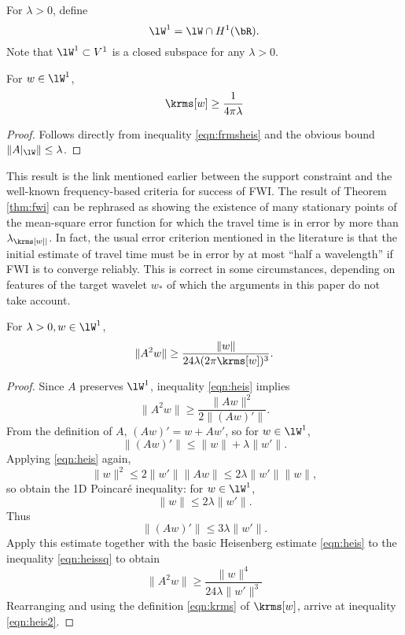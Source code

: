 For $\lambda >0$, define
\begin{equation}
  \label{eqn:wlam1}
  \lW^1 = \lW \cap H^1(\bR).
\end{equation}
Note that $\lW^1 \subset V^1$ is a closed subspace for any
$\lambda>0$.

\begin{proposition}
  \label{thm:klam}
  For $w \in \lW^1$,
  \[
    \krms[w] \ge \frac{1}{4 \pi \lambda}
  \]
\end{proposition}

\begin{proof}
  Follows directly from inequality \ref{eqn:frmsheis} and the obvious bound
  $\|A|_{\lW}\|\le \lambda$.
\end{proof}

 This result is the link mentioned earlier between the support
constraint and the well-known frequency-based criteria for success of
FWI. The result of Theorem \ref{thm:fwi} can be rephrased as showing the
existence of many stationary points of the mean-square error function
for which the travel time is in error by more than
$\lambda_{\krms[w]|}$. In fact, the usual error criterion mentioned in the
literature is that the initial estimate of travel time must be in error by at most ``half a
wavelength'' if FWI is to converge reliably. This is correct in some
circumstances, depending on features of the target wavelet $w_*$ of
which the arguments in this paper do not take account.

\begin{proposition}
  \label{thm:heis2}
  For $\lambda>0, w \in \lW^1$,
  \begin{equation}
    \label{eqn:heis2}
    \|A^2w\| \ge \frac{\|w\|}{24 \lambda (2\pi\krms[w])^3}.
  \end{equation}
\end{proposition}

\begin{proof}
  Since $A$  preserves $\lW^1$, inequality \ref{eqn:heis} implies
  \begin{equation}
    \label{eqn:heissq}
    \|A^2w\| \ge \frac{\|Aw\|^2}{2\|(Aw)'\|}.
  \end{equation}
  From the definition of $A$, $(Aw)'=w +Aw'$, so for $w \in \lW^1$,
  \[
    \|(Aw)'\| \le \|w\|+ \lambda\|w'\|.
  \]
  Applying \ref{eqn:heis} again,
  \[
    \|w\|^2 \le 2\|w'\|\|Aw\|\le 2\lambda \|w'\|\|w\|,
  \]
  so obtain the 1D Poincar\'{e} inequality: for $w \in \lW^1$,
  \[
    \|w\| \le 2\lambda\|w'\|.
  \]
  Thus
  \[
    \|(Aw)'\| \le 3\lambda\|w'\|.
  \]
  Apply this estimate together with the basic Heisenberg estimate
  \ref{eqn:heis} to the inequality \ref{eqn:heissq} to obtain
  \[
    \|A^2w\| \ge \frac{\|w\|^4}{24\lambda \|w'\|^3}
  \]
  Rearranging and using the definition \ref{eqn:krms} of $\krms[w]$,
  arrive at inequality \ref{eqn:heis2}.
\end{proof}

